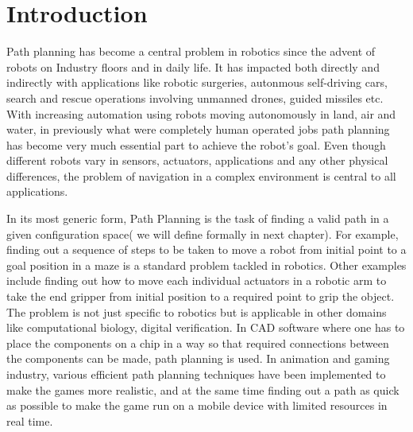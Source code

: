 \documentclass[MTech]{iitmdiss}
\begin{document}

\begin{singlespace}
\tableofcontents
\thispagestyle{empty}

\listoffigures
{}
\end{singlespace}

\pagebreak



%
%
\chapter{Introduction}

Path planning has become a central problem in robotics since the advent of robots on Industry floors and in daily life. It has impacted both directly and indirectly with applications like robotic surgeries, autonmous self-driving cars, search and rescue operations involving unmanned drones, guided missiles etc. With increasing automation using robots moving autonomously in land, air and water, in previously what were completely human operated jobs path planning has become very much essential part to achieve the robot's goal. Even though different robots vary in sensors, actuators, applications and any other physical differences, the problem of navigation in a complex environment is central to all applications. 

 In its most generic form, Path Planning is the task of finding a valid path in a given configuration space( we will define formally in next chapter). For example, finding out a sequence of steps to be taken to move a robot from initial point to a goal position in a maze is a standard problem tackled in robotics. Other examples include finding out how to move each individual actuators in a robotic arm to take the end gripper from initial position to a required point to grip the object. The problem is not just specific to robotics but is applicable in other domains like computational biology, digital verification. In CAD software where one has to place the components on a chip in a way so that required connections between the components can be made, path planning is used. In animation and gaming industry, various efficient path planning techniques have been implemented to make the games more realistic, and at the same time finding out a path as quick as possible to make the game run on a mobile device with limited resources in real time.
 
\end{document}
